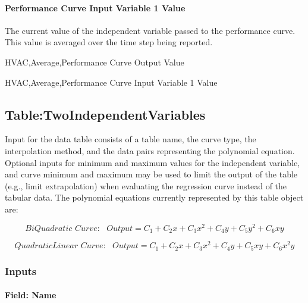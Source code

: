 \paragraph{\texorpdfstring{Performance Curve Input Variable 1 Value \protect\hyperlink{section-1}{}}{Performance Curve Input Variable 1 Value }}\label{performance-curve-input-variable-1-value}

The current value of the independent variable passed to the performance curve. This value is averaged over the time step being reported.

HVAC,Average,Performance Curve Output Value \protect\hyperlink{section-1}{}

HVAC,Average,Performance Curve Input Variable 1 Value \protect\hyperlink{section-1}{}

\subsection{Table:TwoIndependentVariables}\label{tabletwoindependentvariables}

Input for the data table consists of a table name, the curve type, the interpolation method, and the data pairs representing the polynomial equation. Optional inputs for minimum and maximum values for the independent variable, and curve minimum and maximum may be used to limit the output of the table (e.g., limit extrapolation) when evaluating the regression curve instead of the tabular data. The polynomial equations currently represented by this table object are:

\begin{equation}
BiQuadratic\,\,Curve:\,\,\,\,Output = {C_1} + {C_2}x + {C_3}{x^2} + {C_4}y + {C_5}{y^2} + {C_6}xy
\end{equation}

\begin{equation}
QuadraticLinear\,\,Curve:\,\,\,\,Output = {C_1} + {C_2}x + {C_3}{x^2} + {C_4}y + {C_5}xy + {C_6}{x^2}y
\end{equation}

\subsubsection{Inputs}\label{inputs-1-029}

\paragraph{Field: Name}\label{field-name-1-028}

